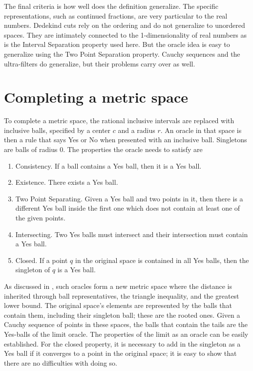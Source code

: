 \documentclass[12pt]{article}
\theoremstyle{remark}
\begin{document}
The final criteria is how well does the definition generalize. The specific representations, such as continued fractions, are very particular to the real numbers. Dedekind cuts rely on the ordering and do not generalize to unordered spaces. They are intimately connected to the 1-dimensionality of real numbers as is the Interval Separation property used here. But the oracle idea is easy to generalize using the Two Point Separation property. Cauchy sequences and the ultra-filters do generalize, but their problems carry over as well. 

\section{Completing a metric space}

To complete a metric space, the rational inclusive intervals are replaced with inclusive balls, specified by a center $c$ and a radius $r$. An oracle in that space is then a rule that says Yes or No when presented with an inclusive ball. Singletons are balls of radius $0$. The properties the oracle needs to satisfy are
\begin{enumerate}
    \item Consistency. If a ball contains a Yes ball, then it is a Yes ball. 
    \item Existence. There exists a Yes ball.
    \item Two Point Separating. Given a Yes ball and two points in it, then there is a different Yes ball inside the first one which does not contain at least one of the given points. 
    \item Intersecting. Two Yes balls must intersect and their intersection must contain a Yes ball.
    \item Closed. If a point $q$ in the original space is contained in all Yes balls, then the singleton of $q$ is a Yes ball.
\end{enumerate}

As discussed in \cite{taylor23metric}, such oracles form a new metric space where the distance is inherited through ball representatives, the triangle inequality, and the greatest lower bound. The original space's elements are represented by the balls that contain them, including their singleton ball; these are the rooted ones. Given a Cauchy sequence of points in these spaces, the balls that contain the tails are the Yes-balls of the limit oracle. The properties of the limit as an oracle can be easily established. For the closed property, it is necessary to add in the singleton as a Yes ball if it converges to a point in the original space; it is easy to show that there are no difficulties with doing so. 
\end{document}
